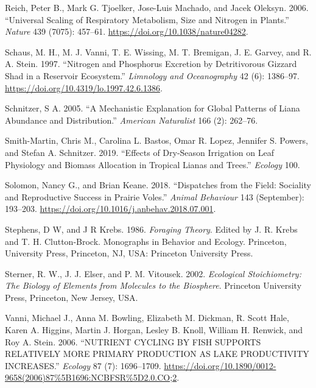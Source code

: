 \documentclass[
  letterpaper,
  DIV=11,
  numbers=noendperiod]{scrreprt}
\newlength{\cslhangindent}
\newenvironment{CSLReferences}[2] %
 {\begin{list}{}{%
  \setlength{\itemindent}{0pt}
  \setlength{\leftmargin}{0pt}
  \setlength{\parsep}{0pt}
  \ifodd #1
   \setlength{\leftmargin}{\cslhangindent}
   \setlength{\itemindent}{-1\cslhangindent}
  \fi
  \setlength{\itemsep}{#2\baselineskip}}}
 {\end{list}}
\begin{document}
\begin{CSLReferences}{1}{0}
Reich, Peter B., Mark G. Tjoelker, Jose-Luis Machado, and Jacek Oleksyn.
2006. {``Universal Scaling of Respiratory Metabolism, Size and Nitrogen
in Plants.''} \emph{Nature} 439 (7075): 457--61.
\url{https://doi.org/10.1038/nature04282}.

Schaus, M. H., M. J. Vanni, T. E. Wissing, M. T. Bremigan, J. E. Garvey,
and R. A. Stein. 1997. {``Nitrogen and Phosphorus Excretion by
Detritivorous Gizzard Shad in a Reservoir Ecosystem.''} \emph{Limnology
and Oceanography} 42 (6): 1386--97.
\url{https://doi.org/10.4319/lo.1997.42.6.1386}.

Schnitzer, S A. 2005. {``A Mechanistic Explanation for Global Patterns
of Liana Abundance and Distribution.''} \emph{American Naturalist} 166
(2): 262--76.

Smith-Martin, Chris M., Carolina L. Bastos, Omar R. Lopez, Jennifer S.
Powers, and Stefan A. Schnitzer. 2019. {``Effects of Dry-Season
Irrigation on Leaf Physiology and Biomass Allocation in Tropical Lianas
and Trees.''} \emph{Ecology} 100.

Solomon, Nancy G., and Brian Keane. 2018. {``Dispatches from the Field:
Sociality and Reproductive Success in Prairie Voles.''} \emph{Animal
Behaviour} 143 (September): 193--203.
\url{https://doi.org/10.1016/j.anbehav.2018.07.001}.

Stephens, D W, and J R Krebs. 1986. \emph{Foraging {Theory}}. Edited by
J. R. Krebs and T. H. Clutton-Brock. Monographs in Behavior and Ecology.
{Princeton, University Press, Princeton, NJ, USA}: {Princeton University
Press}.

Sterner, R. W., J. J. Elser, and P. M. Vitousek. 2002. \emph{Ecological
{Stoichiometry}: {The Biology} of {Elements} from {Molecules} to the
{Biosphere}}. Princeton University Press, Princeton, New Jersey, USA.

Vanni, Michael J., Anna M. Bowling, Elizabeth M. Dickman, R. Scott Hale,
Karen A. Higgins, Martin J. Horgan, Lesley B. Knoll, William H. Renwick,
and Roy A. Stein. 2006. {``{NUTRIENT CYCLING BY FISH SUPPORTS RELATIVELY
MORE PRIMARY PRODUCTION AS LAKE PRODUCTIVITY INCREASES}.''}
\emph{Ecology} 87 (7): 1696--1709.
\url{https://doi.org/10.1890/0012-9658(2006)87\%5B1696:NCBFSR\%5D2.0.CO;2}.


\end{CSLReferences}
\end{document}
